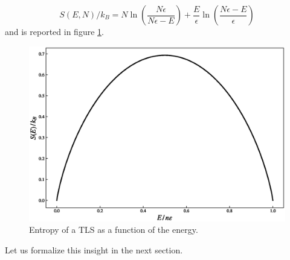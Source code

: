 \begin{equation*}
    S(E, N) / k_B = N \ln\left(\frac{N\epsilon}{N\epsilon - E}\right) + \frac{E}{\epsilon} \ln\left(\frac{N\epsilon - E}{\epsilon}\right)
\end{equation*}
and is reported in figure \ref{fig:TLS_entropy_E}. \\
\begin{figure}
    \centering 
    \includegraphics[scale=0.65]{images/entropy_TLS.eps}
    \caption{Entropy of a TLS as a function of the energy.}
    \label{fig:TLS_entropy_E}
\end{figure}
Let us formalize this insight in the next section.

